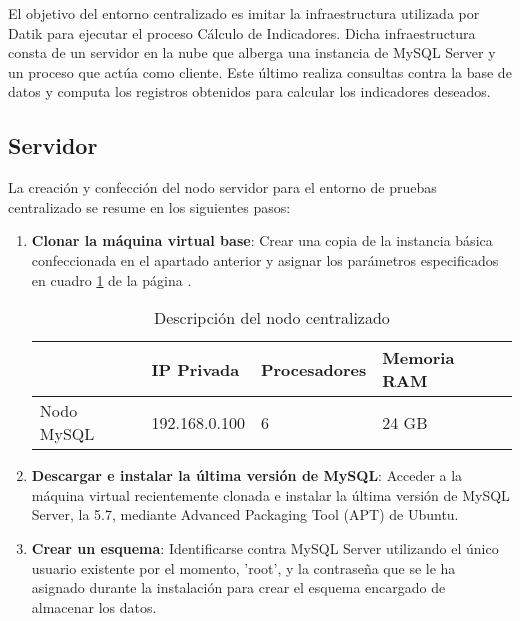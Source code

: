 El objetivo del entorno centralizado es imitar la infraestructura utilizada por Datik para ejecutar el proceso Cálculo de Indicadores. Dicha infraestructura consta de un servidor en la nube que alberga una instancia de MySQL Server y un proceso que actúa como cliente. Este último realiza consultas contra la base de datos y computa los registros obtenidos para calcular los indicadores deseados.

\subsection{Servidor}

La creación y confección del nodo servidor para el entorno de pruebas centralizado se resume en los siguientes pasos:

\begin{enumerate}
	
\item \textbf{Clonar la máquina virtual base}: Crear una copia de la instancia básica confeccionada en el apartado anterior y asignar los parámetros especificados en cuadro \ref{nodo-mysql} de la página \pageref{nodo-mysql}.

\begin{table}[h!]
	\centering
	\begin{tabular}{|l||l|l|l|}
		
		\hline
		
		& \textbf{IP Privada} & \textbf{Procesadores} & \textbf{Memoria RAM} \\
		
		\hline
		\hline
		
		Nodo MySQL & 192.168.0.100 & 6 & 24 GB \\
		
		\hline
		
	\end{tabular}
	\caption{Descripción del nodo centralizado}
	\label{nodo-mysql}
\end{table}

\item \textbf{Descargar e instalar la última versión de MySQL}: Acceder a la máquina virtual recientemente clonada e instalar la última versión de MySQL Server, la 5.7, mediante Advanced Packaging Tool (APT) de Ubuntu.

\item \textbf{Crear un esquema}: Identificarse contra MySQL Server utilizando el único usuario existente por el momento, 'root', y la contraseña que se le ha asignado durante la instalación para crear el esquema encargado de almacenar los datos.


\end{enumerate}
